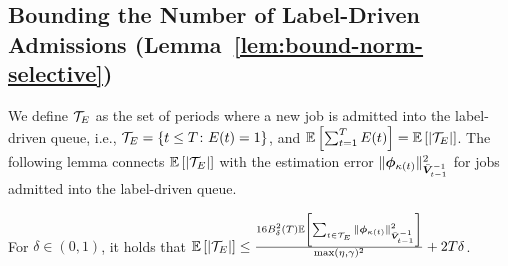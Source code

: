 \subsection{Bounding the Number of Label-Driven Admissions  (Lemma~\ref{lem:bound-norm-selective})}\label{app:lem-bound-norm-selective}
We define $\mathcal{T}_E$ as the set of periods where a new job is admitted into the label-driven queue, i.e., $\mathcal{T}_E = \{t\leq T\colon E(t) = 1\}$, and $\mathbb E\left[\sum_{t=1}^T E(t)\right] = \mathbb E\left[|\mathcal{T}_E|\right]$. The following lemma connects $\mathbb E\left[|\mathcal{T}_E|\right]$ with the estimation error $\|\boldsymbol{\phi}_{\kappa(t)}\|_{\bar{\boldsymbol{V}}_{t-1}^{-1}}^2$ for jobs admitted into the label-driven queue.
\begin{lemma}\label{lem:conntect-te-norm}
For $\delta \in (0,1)$, it holds that $\mathbb E\left[|\mathcal{T}_E|\right] \leq \frac{16B_{\delta}^2(T)\mathbb E\left[\sum_{t \in \mathcal{T}_E} \|\boldsymbol{\phi}_{\kappa(t)}\|_{\bar{\boldsymbol{V}}_{t-1}^{-1}}^2\right]}{\max(\eta,\gamma)^2} + 2T\delta$.
\end{lemma}
